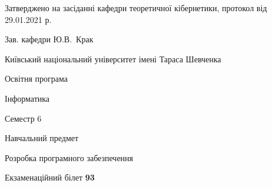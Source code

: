 \documentclass[10pt, ukrainian]{article}
\begin{document}
{\vspace{5mm}\smallskip \begin {small} Затверджено на засіданні кафедри теоретичної кібернетики, протокол  від   29.01.2021 р.\par\smallskip\smallskip
{\parbox {6.5 cm}{Зав. кафедри \dotfill Ю.В.~Крак}} \end{small}}
\newpage

{{\begin {small}\par
{ \center  Київський національний університет імені Тараса Шевченка \par}
{\parbox {5 cm}{Освітня програма \hfill}{\parbox {7 cm}{Інформатика \hfill}}\parbox {6 cm}{\hfill Семестр 6}}\par
{\parbox {5 cm} {Навчальний предмет \hfill}\parbox {7 cm}{Розробка програмного забезпечення \hfill}\parbox {6cm}{\hfill}\par}\vspace{-7pt} \end{small}}{\center Екзаменаційний білет \No \textbf
{ 93 }\par}}
\end{document}
